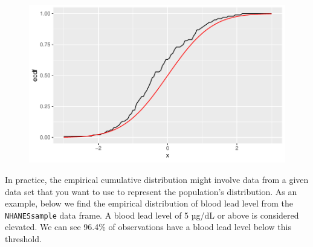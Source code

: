 \documentclass[
  letterpaper,
]{krantz}
\makeatletter
\newenvironment{Shaded}{\begin{snugshade}}{\end{snugshade}}
\newcommand{\AttributeTok}[1]{\textcolor[rgb]{0.40,0.45,0.13}{#1}}
\newcommand{\DecValTok}[1]{\textcolor[rgb]{0.68,0.00,0.00}{#1}}
\newcommand{\FloatTok}[1]{\textcolor[rgb]{0.68,0.00,0.00}{#1}}
\newcommand{\FunctionTok}[1]{\textcolor[rgb]{0.28,0.35,0.67}{#1}}
\newcommand{\NormalTok}[1]{\textcolor[rgb]{0.00,0.23,0.31}{#1}}
\newcommand{\OtherTok}[1]{\textcolor[rgb]{0.00,0.23,0.31}{#1}}
\newcommand{\SpecialCharTok}[1]{\textcolor[rgb]{0.37,0.37,0.37}{#1}}
\newcommand{\StringTok}[1]{\textcolor[rgb]{0.13,0.47,0.30}{#1}}
\newenvironment{kframe}{%
\medskip{}
\setlength{\fboxsep}{.8em}
 \def\at@end@of@kframe{}%
 \ifinner\ifhmode%
  \def\at@end@of@kframe{\end{minipage}}%
  \begin{minipage}{\columnwidth}%
 \fi\fi%
 \def\FrameCommand##1{\hskip\@totalleftmargin \hskip-\fboxsep
 \colorbox{shadecolor}{##1}\hskip-\fboxsep
     \hskip-\linewidth \hskip-\@totalleftmargin \hskip\columnwidth}%
 \MakeFramed {\advance\hsize-\width
   \@totalleftmargin\z@ \linewidth\hsize
   \@setminipage}}%
 {\par\unskip\endMakeFramed%
 \at@end@of@kframe}
\renewenvironment{Shaded}{\begin{kframe}}{\end{kframe}}
\makeatother
\begin{document}
\begin{Shaded}
\end{Shaded}

\begin{figure}[H]

{\centering \includegraphics[width=1\textwidth,height=\textheight]{book/8_distributions_files/figure-pdf/unnamed-chunk-24-1.pdf}

}

\end{figure}

In practice, the empirical cumulative distribution might involve data
from a given data set that you want to use to represent the population's
distribution. As an example, below we find the empirical distribution of
blood lead level from the \texttt{NHANESsample} data frame. A blood lead
level of 5 µg/dL or above is considered elevated. We can see 96.4\% of
observations have a blood lead level below this threshold.
\end{document}
